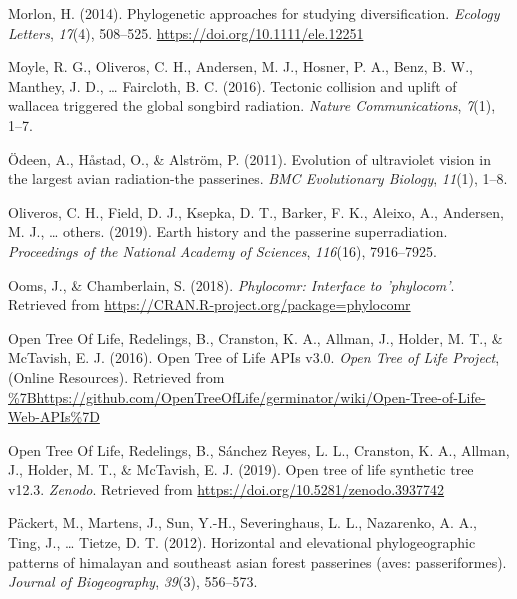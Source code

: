 \documentclass[
  man]{apa6}
\newlength{\cslhangindent}
\newlength{\cslentryspacingunit} %
\newenvironment{CSLReferences}[2] %
 {%
  \setlength{\parindent}{0pt}
  \ifodd #1
  \let\oldpar\par
  \def\par{\hangindent=\cslhangindent\oldpar}
  \fi
  \setlength{\parskip}{#2\cslentryspacingunit}
 }%
 {}
\begin{document}
\begin{CSLReferences}{1}{0}
\leavevmode{}%
Morlon, H. (2014). {Phylogenetic approaches for studying diversification.} \emph{{Ecology Letters}}, \emph{17}(4), 508--525. \url{https://doi.org/10.1111/ele.12251}

\leavevmode{}%
Moyle, R. G., Oliveros, C. H., Andersen, M. J., Hosner, P. A., Benz, B. W., Manthey, J. D., \ldots{} Faircloth, B. C. (2016). Tectonic collision and uplift of wallacea triggered the global songbird radiation. \emph{Nature Communications}, \emph{7}(1), 1--7.

\leavevmode{}%
Ödeen, A., Håstad, O., \& Alström, P. (2011). Evolution of ultraviolet vision in the largest avian radiation-the passerines. \emph{BMC Evolutionary Biology}, \emph{11}(1), 1--8.

\leavevmode{}%
Oliveros, C. H., Field, D. J., Ksepka, D. T., Barker, F. K., Aleixo, A., Andersen, M. J., \ldots{} others. (2019). Earth history and the passerine superradiation. \emph{Proceedings of the National Academy of Sciences}, \emph{116}(16), 7916--7925.

\leavevmode{}%
Ooms, J., \& Chamberlain, S. (2018). \emph{Phylocomr: Interface to 'phylocom'}. Retrieved from \url{https://CRAN.R-project.org/package=phylocomr}

\leavevmode{}%
Open Tree Of Life, Redelings, B., Cranston, K. A., Allman, J., Holder, M. T., \& McTavish, E. J. (2016). {Open Tree of Life APIs v3.0}. \emph{{Open Tree of Life Project}}, (Online Resources). Retrieved from \url{\%7Bhttps://github.com/OpenTreeOfLife/germinator/wiki/Open-Tree-of-Life-Web-APIs\%7D}

\leavevmode{}%
Open Tree Of Life, Redelings, B., Sánchez Reyes, L. L., Cranston, K. A., Allman, J., Holder, M. T., \& McTavish, E. J. (2019). Open tree of life synthetic tree v12.3. \emph{Zenodo}. Retrieved from \url{https://doi.org/10.5281/zenodo.3937742}

\leavevmode{}%
Päckert, M., Martens, J., Sun, Y.-H., Severinghaus, L. L., Nazarenko, A. A., Ting, J., \ldots{} Tietze, D. T. (2012). Horizontal and elevational phylogeographic patterns of himalayan and southeast asian forest passerines (aves: passeriformes). \emph{Journal of Biogeography}, \emph{39}(3), 556--573.


\end{CSLReferences}
\end{document}
